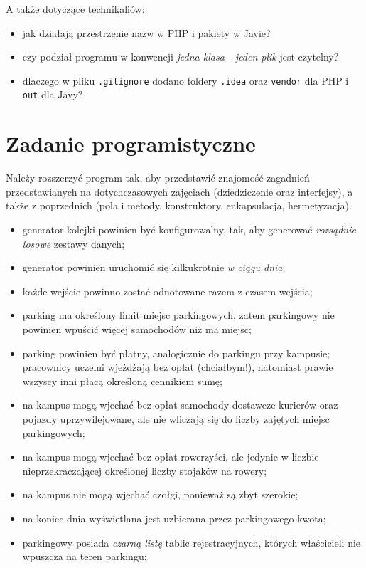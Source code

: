 \documentclass{article}
\begin{document}
	
	A także dotyczące technikaliów:
	\begin{itemize}
		\item jak działają przestrzenie nazw w PHP i pakiety w Javie?
		\item czy podział programu w konwencji \emph{jedna klasa - jeden plik} jest czytelny?
		\item dlaczego w pliku \texttt{.gitignore} dodano foldery \texttt{.idea} oraz \texttt{vendor} dla PHP i \texttt{out} dla Javy?
	\end{itemize}

	\section{Zadanie programistyczne}
	Należy rozszerzyć program tak, aby przedstawić znajomość zagadnień przedstawianych na dotychczasowych zajęciach (dziedziczenie oraz interfejsy), a także z poprzednich (pola i metody, konstruktory, enkapsulacja, hermetyzacja).
	
	\begin{itemize}
		\item generator kolejki powinien być konfigurowalny, tak, aby generować \emph{rozsądnie losowe} zestawy danych;
		\item generator powinien uruchomić się kilkukrotnie \emph{w ciągu dnia};
		\item każde wejście powinno zostać odnotowane razem z czasem wejścia;
		
		\item parking ma określony limit miejsc parkingowych, zatem parkingowy nie powinien wpuścić więcej samochodów niż ma miejsc;
		\item parking powinien być płatny, analogicznie do parkingu przy kampusie; pracownicy uczelni wjeżdżają bez opłat (chciałbym!), natomiast prawie wszyscy inni płacą określoną cennikiem sumę;
		\item na kampus mogą wjechać bez opłat samochody dostawcze kurierów oraz pojazdy uprzywilejowane, ale nie wliczają się do liczby zajętych miejsc parkingowych;
		\item na kampus mogą wjechać bez opłat rowerzyści, ale jedynie w liczbie nieprzekraczającej określonej liczby stojaków na rowery;
		\item na kampus nie mogą wjechać czołgi, ponieważ są zbyt szerokie;
		
		\item na koniec dnia wyświetlana jest uzbierana przez parkingowego kwota;
		\item parkingowy posiada \emph{czarną listę} tablic rejestracyjnych, których właścicieli nie wpuszcza na teren parkingu;
	\end{itemize}
	
\end{document}
